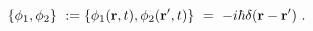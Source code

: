 \begin{equation}
\{\phi _{1},\phi _{2}\}\ :=\{\phi _{1}({\bf r},t),\phi _{2}({\bf r^{\prime }}%
,t)\}\ =\ -i\hbar \delta ({\bf r}-{\bf r^{\prime }})\ .  \label{secondclass}
\end{equation}

